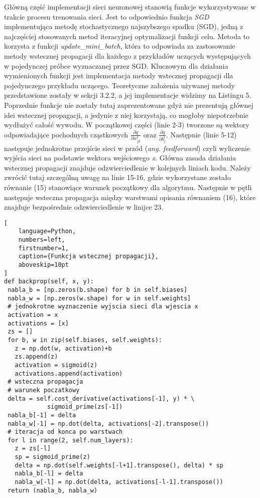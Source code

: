 \par Główną część implementacji sieci neuronowej stanowią funkcje wykorzystywane w trakcie procesu trenowania sieci. Jest to odpowiednio funkcja \emph{SGD} implementująca metodę stochastycznego najszybszego spadku (SGD), jedną z najczęściej stosowanych metod iteracyjnej optymalizacji funkcji celu. Metoda to korzysta z funkcji \emph{update{\_}mini{\_}batch}, która to odpowiada za zastosowanie metody wstecznej propagacji dla każdego z przykładów uczących występujących w pojedynczej próbce wyznaczanej przez SGD. Kluczowym dla działania wymienionych funkcji jest implementacja metody wstecznej propagacji dla pojedynczego przykładu uczącego. Teoretyczne założenia używanej metody przedstawione zostały w sekcji 3.2.2, a jej implementacje widzimy na Listingu 5. Poprzednie funkcje nie zostały tutaj zaprezentowane gdyż nie prezentują głównej idei wstecznej propagacji, a jedynie z niej korzystają, co mogłoby niepotrzebnie wydłużyć całość wywodu. W początkowej części (linie 2-3) tworzone są wektory odpowiadające pochodnych cząstkowych \( \frac{\partial q}{\partial w_{jk}^l} \) oraz \( \frac{\partial q}{\partial b_j^l} \). Następnie (linie 5-12) następuje jednokrotne przejście sieci w przód (\emph{ang. feedforward}) czyli wyliczenie wyjścia sieci na podstawie wektora wejściowego \emph{x}. Główna zasada działania wstecznej propagacji znajduje odzwierciedlenie w kolejnych liniach kodu. Należy zwrócić tutaj szczególną uwagę na linie 15-16, gdzie wykorzystane zostało równanie (15) stanowiące warunek początkowy dla algorytmu. Następnie w pętli następuje wsteczna propagacja między warstwami opisania równaniem (16), które znajduje bezpośrednie odzwierciedlenie w linijce 23.
\begin{addmargin}[10mm]{0mm}
\begin{lstlisting}[
    language=Python,
    numbers=left,
    firstnumber=1,
    caption={Funkcja wstecznej propagacji},
    aboveskip=10pt
]
def backprop(self, x, y):
 nabla_b = [np.zeros(b.shape) for b in self.biases]
 nabla_w = [np.zeros(w.shape) for w in self.weights]
 # jednokrotne wyznaczenie wyjscia sieci dla wjescia x
 activation = x
 activations = [x] 
 zs = []
 for b, w in zip(self.biases, self.weights):
   z = np.dot(w, activation)+b
   zs.append(z)
   activation = sigmoid(z)
   activations.append(activation)
 # wsteczna propagacja
 # warunek poczatkowy
 delta = self.cost_derivative(activations[-1], y) * \
            sigmoid_prime(zs[-1])
 nabla_b[-1] = delta
 nabla_w[-1] = np.dot(delta, activations[-2].transpose())
 # iteracja od konca po warstwach
 for l in range(2, self.num_layers):
   z = zs[-l]
   sp = sigmoid_prime(z)
   delta = np.dot(self.weights[-l+1].transpose(), delta) * sp
   nabla_b[-l] = delta
   nabla_w[-l] = np.dot(delta, activations[-l-1].transpose())
 return (nabla_b, nabla_w)
\end{lstlisting}
\end{addmargin}

